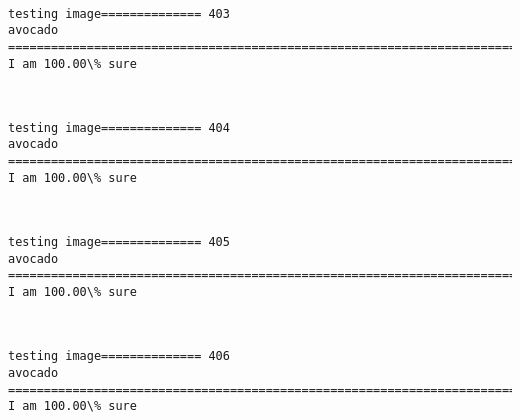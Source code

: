 \documentclass[11pt]{article}
\begin{document}
    \begin{center}
    \end{center}
    { \hspace*{\fill} \\}
    
    \begin{Verbatim}[commandchars=\\\{\}]
testing image============== 403
avocado
============================================================================
I am 100.00\% sure

    \end{Verbatim}

    \begin{center}
    \end{center}
    { \hspace*{\fill} \\}
    
    \begin{Verbatim}[commandchars=\\\{\}]
testing image============== 404
avocado
============================================================================
I am 100.00\% sure

    \end{Verbatim}

    \begin{center}
    \end{center}
    { \hspace*{\fill} \\}
    
    \begin{Verbatim}[commandchars=\\\{\}]
testing image============== 405
avocado
============================================================================
I am 100.00\% sure

    \end{Verbatim}

    \begin{center}
    \end{center}
    { \hspace*{\fill} \\}
    
    \begin{Verbatim}[commandchars=\\\{\}]
testing image============== 406
avocado
============================================================================
I am 100.00\% sure

    \end{Verbatim}
\end{document}
